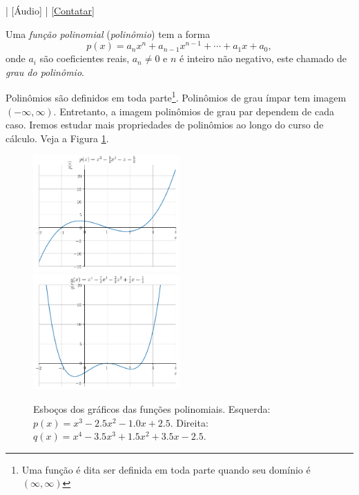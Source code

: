 \begin{flushright}
  [Vídeo] | [Áudio] | \href{https://phkonzen.github.io/notas/contato.html}{[Contatar]}
\end{flushright}

Uma \emph{função polinomial} (\emph{polinômio}) tem a forma
\begin{equation}
  p(x) = a_nx^n + a_{n-1}x^{n-1} + \cdots + a_1x + a_0,
\end{equation}
onde $a_i$ são coeficientes reais, $a_n\neq 0$ e $n$ é inteiro não negativo, este chamado de \emph{grau do polinômio}.

Polinômios são definidos em toda parte\footnote{Uma função é dita ser definida em toda parte quando seu domínio é $(\infty, \infty)$}. Polinômios de grau ímpar tem imagem $(-\infty, \infty)$. Entretanto, a imagem polinômios de grau par dependem de cada caso. Iremos estudar mais propriedades de polinômios ao longo do curso de cálculo. Veja a Figura \ref{fig:poli_graficos}.

\begin{figure}[H]
  \centering
  \includegraphics[width=0.5\textwidth]{./cap_funcao/dados/fig_poli_graficos/fig_poli_impar}~
    \includegraphics[width=0.5\textwidth]{./cap_funcao/dados/fig_poli_graficos/fig_poli_par}
  \caption{Esboços dos gráficos das funções polinomiais. Esquerda: $p(x) = x^{3} - 2.5 x^{2} - 1.0 x + 2.5$. Direita: $q(x) = x^{4} - 3.5 x^{3} + 1.5 x^{2} + 3.5 x - 2.5$.}
  \label{fig:poli_graficos}
\end{figure}

